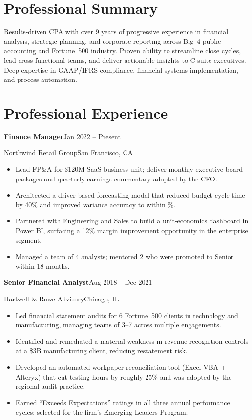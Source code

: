 \documentclass[10pt]{article}
\newcommand{\cvdate}[1]{{\color{softgray}\footnotesize #1}}
\newcommand{\experienceentry}[4]{%
  \vspace{0.45em}%
  {\bfseries #1}\hfill{\cvdate{#3}}%
  \par\vspace{0.05em}%
  {\color{accent}#2}\hfill{\color{softgray}\footnotesize #4}%
  \vspace{0.2em}\par%
}
\begin{document}
\hspace{0.035\textwidth}%
\begin{minipage}[t]{0.68\textwidth}

\section{Professional Summary}

\small
Results-driven CPA with over 9 years of progressive experience in financial
analysis, strategic planning, and corporate reporting across Big~4 public
accounting and Fortune~500 industry. Proven ability to streamline
close cycles, lead cross-functional teams, and deliver actionable insights
to C-suite executives. Deep expertise in GAAP/IFRS compliance, financial
systems implementation, and process automation.

\section{Professional Experience}

\experienceentry{Finance Manager}{Northwind Retail Group}
  {Jan 2022 -- Present}{San Francisco, CA}
\begin{itemize}
  \item Lead FP\&A for \$120M SaaS business unit; deliver monthly
    executive board packages and quarterly earnings commentary adopted
    by the CFO.
  \item Architected a driver-based forecasting model that reduced
    budget cycle time by 40\% and improved variance accuracy to within
    \%.
  \item Partnered with Engineering and Sales to build a unit-economics
    dashboard in Power BI, surfacing a 12\% margin improvement
    opportunity in the enterprise segment.
  \item Managed a team of 4 analysts; mentored 2 who were promoted to
    Senior within 18 months.
\end{itemize}

\experienceentry{Senior Financial Analyst}{Hartwell \& Rowe Advisory}
  {Aug 2018 -- Dec 2021}{Chicago, IL}
\begin{itemize}
  \item Led financial statement audits for 6 Fortune~500 clients in
    technology and manufacturing, managing teams of 3--7 across
    multiple engagements.
  \item Identified and remediated a material weakness in revenue
    recognition controls at a \$3B manufacturing client, reducing
    restatement risk.
  \item Developed an automated workpaper reconciliation tool (Excel VBA
    + Alteryx) that cut testing hours by roughly 25\% and was adopted
    by the regional audit practice.
  \item Earned ``Exceeds Expectations'' ratings in all three annual
    performance cycles; selected for the firm's Emerging Leaders
    Program.
\end{itemize}


\end{minipage}
\end{document}

